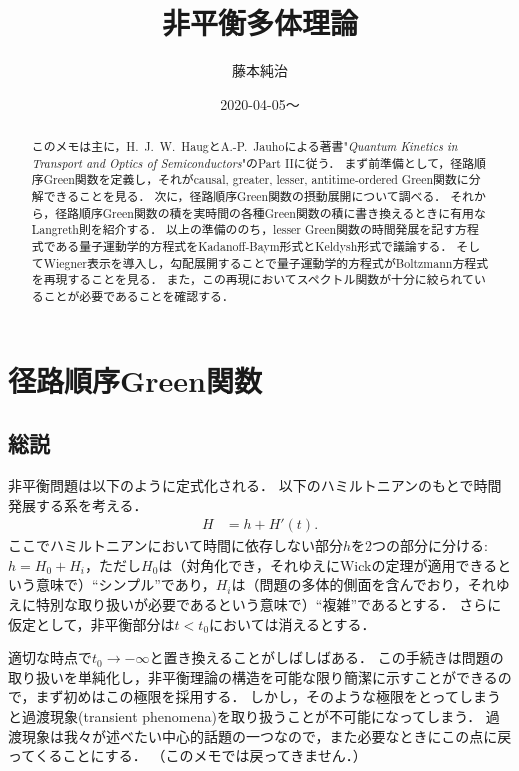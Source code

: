 \documentclass[a4paper,10pt]{jsarticle}
\title{非平衡多体理論}
\affiliation{中国科学院大学 Kavli理論科学研究所}
\author{藤本純治}
\date{2020-04-05〜}
\begin{document}
%
\maketitle

\begin{abstract}
このメモは主に，H.~J.~W.~HaugとA.-P.~Jauhoによる著書"\textit{Quantum Kinetics in Transport and Optics of Semiconductors}"のPart IIに従う．
まず前準備として，径路順序Green関数を定義し，それがcausal, greater, lesser, antitime-ordered Green関数に分解できることを見る．
次に，径路順序Green関数の摂動展開について調べる．
それから，径路順序Green関数の積を実時間の各種Green関数の積に書き換えるときに有用なLangreth則を紹介する．
以上の準備ののち，lesser Green関数の時間発展を記す方程式である量子運動学的方程式をKadanoff-Baym形式とKeldysh形式で議論する．
そしてWiegner表示を導入し，勾配展開することで量子運動学的方程式がBoltzmann方程式を再現することを見る．
また，この再現においてスペクトル関数が十分に絞られていることが必要であることを確認する．
\end{abstract}

\setcounter{section}{3}

\section{径路順序Green関数}
\subsection{\label{sec:4.1}総説}
非平衡問題は以下のように定式化される．
以下のハミルトニアンのもとで時間発展する系を考える．
\begin{align}
H
	& = h + H' (t)
.\end{align}
ここでハミルトニアンにおいて時間に依存しない部分$h$を2つの部分に分ける:$h = H_0 + H_i$，ただし$H_0$は（対角化でき，それゆえにWickの定理が適用できるという意味で）``シンプル''であり，$H_i$は（問題の多体的側面を含んでおり，それゆえに特別な取り扱いが必要であるという意味で）``複雑''であるとする．
さらに仮定として，非平衡部分は$t < t_0$においては消えるとする．

適切な時点で$t_0 \to - \infty$と置き換えることがしばしばある．
この手続きは問題の取り扱いを単純化し，非平衡理論の構造を可能な限り簡潔に示すことができるので，まず初めはこの極限を採用する．
しかし，そのような極限をとってしまうと過渡現象(transient phenomena)を取り扱うことが不可能になってしまう．
過渡現象は我々が述べたい中心的話題の一つなので，また必要なときにこの点に戻ってくることにする．
（このメモでは戻ってきません．）
\end{document}
